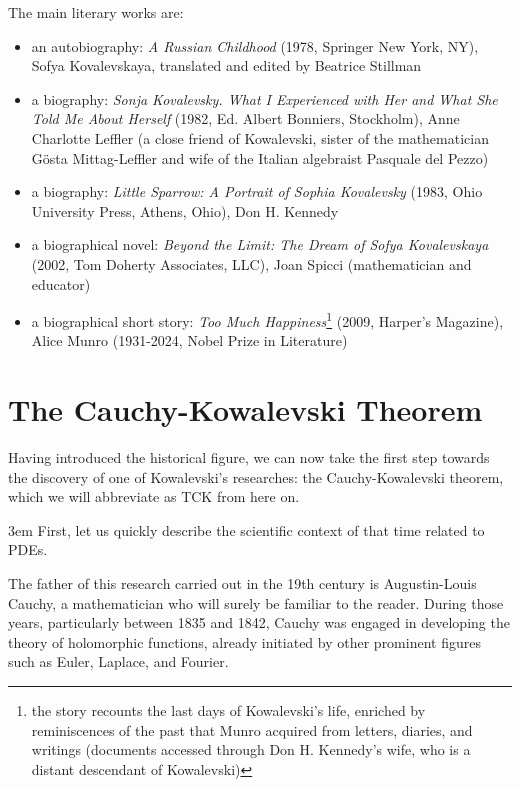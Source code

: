 The main literary works are:
\begin{itemize}

\item an autobiography: \textit{A Russian Childhood} (1978, Springer New York, NY), Sofya Kovalevskaya, translated and edited by Beatrice Stillman

\item a biography: \textit{Sonja Kovalevsky. What I Experienced with Her and What She Told Me About Herself} (1982, Ed. Albert Bonniers, Stockholm), Anne Charlotte Leffler (a close friend of Kowalevski, sister of the mathematician Gösta Mittag-Leffler and wife of the Italian algebraist Pasquale del Pezzo)

\item a biography: \textit{Little Sparrow: A Portrait of Sophia Kovalevsky} (1983, Ohio University Press, Athens, Ohio), Don H. Kennedy

\item a biographical novel: \textit{Beyond the Limit: The Dream of Sofya Kovalevskaya} (2002, Tom Doherty Associates, LLC), Joan Spicci (mathematician and educator)

\item a biographical short story: \textit{Too Much Happiness}\footnote{the story recounts the last days of Kowalevski's life, enriched by reminiscences of the past that Munro acquired from letters, diaries, and writings (documents accessed through Don H. Kennedy's wife, who is a distant descendant of Kowalevski)}
(2009, Harper's Magazine), Alice Munro (1931-2024, Nobel Prize in Literature)

\end{itemize}

\section{The Cauchy-Kowalevski Theorem}

Having introduced the historical figure, we can now take the first step towards the discovery of one of Kowalevski's researches: the Cauchy-Kowalevski theorem, which we will abbreviate as TCK from here on.

\emergencystretch 3em
First, let us quickly describe the scientific context of that time related to PDEs.

The father of this research carried out in the 19th century is Augustin-Louis Cauchy, a mathematician who will surely be familiar to the reader. During those years, particularly between 1835 and 1842, Cauchy was engaged in developing the theory of holomorphic functions, already initiated by other prominent figures such as Euler, Laplace, and Fourier.

